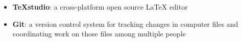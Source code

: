 \begin{itemize}
\item \textbf{TeXstudio}: a cross-platform open source LaTeX editor
\item \textbf{Git}: a version control system for tracking changes in computer files and coordinating work on those files among multiple people
\end{itemize}